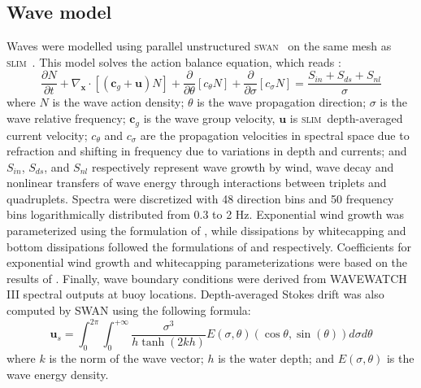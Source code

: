 \documentclass[11pt,a4paper]{article}
\newcommand{\slim}{\textsc{slim}\ }
\newcommand{\swan}{\textsc{swan}\ }
\begin{document}
\subsection{Wave model}
Waves were modelled using parallel unstructured \swan \citep{booij1999third} on the same mesh as \slim. This model solves the action balance equation, which reads \citep{mei1989applied}:
\begin{equation}
    \dfrac{\partial N}{\partial t} + \nabla_\mathbf{x}\cdot[(\mathbf{c}_g+\mathbf{u})N] + \dfrac{\partial }{\partial \theta}[c_\theta N] + \dfrac{\partial}{\partial \sigma}[c_\sigma N] = \dfrac{S_{in}+S_{ds}+S_{nl}}{\sigma} \label{eq:swan}
\end{equation}
where $N$ is the wave action density; $\theta$ is the wave propagation direction; $\sigma$ is the wave relative frequency; $\mathbf{c}_g$ is the wave group velocity, $\mathbf{u}$ is \slim depth-averaged current velocity; $c_\theta$ and $c_\sigma$ are the propagation velocities in spectral space due to refraction and shifting in frequency due to variations in depth and currents; and $S_{in}$, $S_{ds}$, and $S_{nl}$ respectively represent wave growth by wind, wave decay and nonlinear transfers of wave energy through interactions between triplets and quadruplets. Spectra were discretized with 48 direction bins and 50 frequency bins logarithmically distributed from 0.3 to 2 Hz. Exponential wind growth was parameterized using the formulation of \cite{janssen1991quasi}, while dissipations by whitecapping and bottom dissipations followed the formulations of \cite{komen1984existence} and \cite{madsen1989spectral} respectively. Coefficients for exponential wind growth and whitecapping parameterizations were based on the results of \cite{siadatmousavi2011evaluation}. Finally, wave boundary conditions were derived from WAVEWATCH III \citep{tolman2009user} spectral outputs at buoy locations. Depth-averaged Stokes drift was also computed by SWAN using the following formula:
\begin{equation}
    \mathbf{u}_{s} = \int_0^{2\pi}\int_0^{+\infty} \dfrac{\sigma^3}{h\tanh(2kh)}E(\sigma,\theta)(\cos\theta, \sin(\theta))d\sigma d\theta
\end{equation}
where $k$ is the norm of the wave vector; $h$ is the water depth; and $E(\sigma,\theta)$ is the wave energy density.
\end{document}
